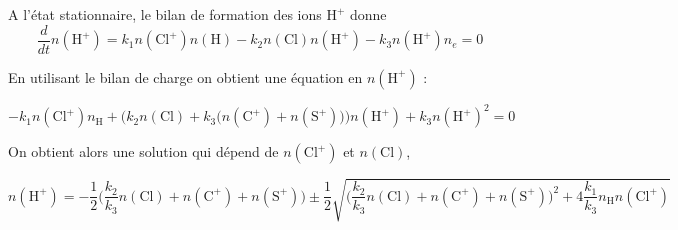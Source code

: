 A l'état stationnaire, le bilan de formation des ions $\mathrm{H}^+$ donne
\begin{equation}\label{eq:h+}
    \frac{d}{dt}n(\mathrm{H}^+) = k_1n(\mathrm{Cl}^+)n(\mathrm{H}) - k_2n(\mathrm{Cl})n(\mathrm{H}^+) - k_3 n(\mathrm{H}^+)n_e = 0
\end{equation}

En utilisant le bilan de charge on obtient une équation en $n(\mathrm{H}^+)$ :

\begin{equation}
    -k_1n(\mathrm{Cl}^+)n_{\mathrm{H}} + \bigg(k_2 n(\mathrm{Cl})+ k_3 \big(n(\mathrm{C}^+)+ n(\mathrm{S}^+)\big) \bigg) n(\mathrm{H}^+) + k_3 n(\mathrm{H}^+)^2 = 0
\end{equation}

On obtient alors une solution qui dépend de $n(\mathrm{Cl}^+)$ et $n(\mathrm{Cl})$,

\begin{equation}
n(\mathrm{H}^+) = -\frac{1}{2} \bigg( \frac{k_2}{k_3} n(\mathrm{Cl}) + n(\mathrm{C}^+)+ n(\mathrm{S}^+) \bigg) \pm \frac{1}{2} \sqrt{\bigg( \frac{k_2}{k_3} n(\mathrm{Cl}) + n(\mathrm{C}^+)+ n(\mathrm{S}^+) \bigg)^2 + 4\frac{k_1}{k_3}n_{\mathrm{H}} n(\mathrm{Cl}^+)}
\end{equation}




